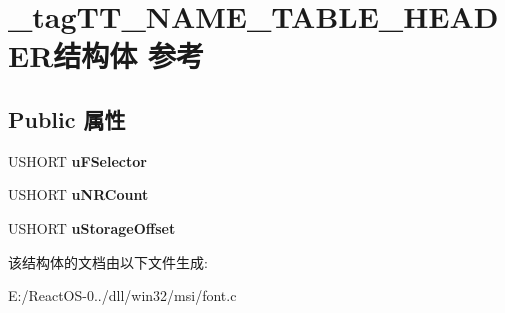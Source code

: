 \hypertarget{struct__tag_t_t___n_a_m_e___t_a_b_l_e___h_e_a_d_e_r}{}\section{\+\_\+tag\+T\+T\+\_\+\+N\+A\+M\+E\+\_\+\+T\+A\+B\+L\+E\+\_\+\+H\+E\+A\+D\+E\+R结构体 参考}
\label{struct__tag_t_t___n_a_m_e___t_a_b_l_e___h_e_a_d_e_r}
\subsection*{Public 属性}
\begin{DoxyCompactItemize}
\item 
\mbox{\label{struct__tag_t_t___n_a_m_e___t_a_b_l_e___h_e_a_d_e_r_a89f8d9839c5f0d28744716895a354f12}} 
U\+S\+H\+O\+RT {\bfseries u\+F\+Selector}
\item 
\mbox{\label{struct__tag_t_t___n_a_m_e___t_a_b_l_e___h_e_a_d_e_r_a2646537d17160835c6e0b2e998975f23}} 
U\+S\+H\+O\+RT {\bfseries u\+N\+R\+Count}
\item 
\mbox{\label{struct__tag_t_t___n_a_m_e___t_a_b_l_e___h_e_a_d_e_r_a80920118cf527c89980a3b35f9d54249}} 
U\+S\+H\+O\+RT {\bfseries u\+Storage\+Offset}
\end{DoxyCompactItemize}


该结构体的文档由以下文件生成\+:\begin{DoxyCompactItemize}
\item 
E\+:/\+React\+O\+S-\/0../dll/win32/msi/font.\+c\end{DoxyCompactItemize}
